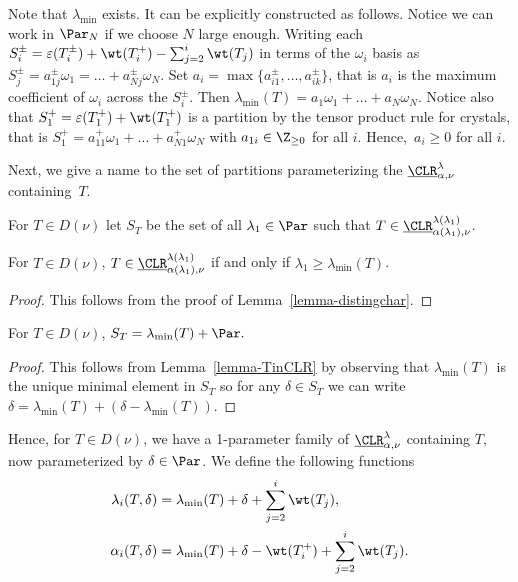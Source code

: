 Note that $\lambda_{\min}$ exists. It can be explicitly constructed as follows. Notice we can work in $\Par_N$ if we choose $N$ large enough. Writing each $S^\pm_i = \varepsilon(T_i^\pm) + \wt(T_i^+) - \sum_{j=2}^{i} \wt(T_j)$ in terms of the $\omega_i$ basis as $S^\pm_j = a^\pm_{1 j}\omega_1 = \dots + a^\pm_{N j} \omega_{N}$. Set $a_i = \max \{a^\pm_{i 1}, \dots , a^\pm_{i k} \}$, that is $a_i$ is the maximum coefficient of $\omega_i$ across the $S^\pm_i$. Then $\lambda_{\min}(T) = a_1 \omega_1 + \dots + a_{N} \omega_{N}$. Notice also that $S_1^+ = \varepsilon(T_1^+) + \wt(T_1^+)$ is a partition by the tensor product rule for crystals, that is $S_1^+ = a^+_{11} \omega_1 + \dots + a^+_{N 1} \omega_N$ with $a_{1i} \in \Z_{\geq 0}$ for all $i$. Hence,~$a_i \geq 0$ for all $i$.

Next, we give a name to the set of partitions parameterizing the $\underbar{\CLR}^\lambda_{\alpha, \nu}$ containing~$T$. 

\begin{defn}
    For $T \in D(\nu)$ let $S_T$ be the set of all $\lambda_1 \in \Par$ such that $T \in \underbar{\CLR}^{\lambda(\lambda_1)}_{\alpha(\lambda_1), \nu}$.
\end{defn}


\begin{lemma}\label{lemma-TinCLR}
    For $T \in D(\nu)$, $T \in \underbar{\CLR}^{\lambda(\lambda_1)}_{\alpha(\lambda_1), \nu}$ if and only if $\lambda_1 \geq \lambda_{\min}(T)$.
\end{lemma}

\begin{proof}
    This follows from the proof of Lemma~\ref{lemma-distingchar}.
\end{proof}

\begin{lemma}
    For $T \in D(\nu)$, $S_T = \lambda_{\min}(T) + \Par.$
\end{lemma}

\begin{proof}
    This follows from Lemma~\ref{lemma-TinCLR} by observing that $\lambda_{\min}(T)$ is the unique minimal element in $S_T$ so for any $\delta \in S_T$ we can write $\delta = \lambda_{\min}(T) + (\delta - \lambda_{\min}(T))$.
\end{proof}


Hence, for $T \in D(\nu)$, we have a 1-parameter family of $\underbar{\CLR}^\lambda_{\alpha, \nu}$ containing $T$, now parameterized by $\delta \in \Par$. We define the following functions
\begin{align*}
\lambda_i(T, \delta) &= \lambda_{\min}(T) + \delta + \sum_{j=2}^{i} \wt(T_j), \\
\alpha_i(T, \delta) &= \lambda_{\min}(T) + \delta - \wt(T_i^+) + \sum_{j=2}^{i} \wt(T_j).
\end{align*}

